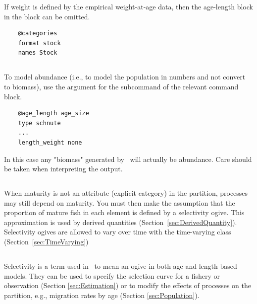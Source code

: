 If weight is defined by the empirical weight-at-age data, then the age-length block in the  block can be omitted.

{\small{\begin{verbatim}
	@categories
	format stock
	names Stock
\end{verbatim}}}

\subsection{\label{sec:weightless-model}}

To model abundance (i.e., to model the population in numbers and not convert to biomass), use the argument  for the subcommand  of the relevant   command block.

{\small{\begin{verbatim}
	@age_length age_size
	type schnute
	...
	length_weight none
\end{verbatim}}}

In this case any "biomass" generated by \CNAME\ will actually be abundance. Care should be taken when interpreting the output.
\fi %

\subsection{\label{sec:maturity-notinpartition}}

When maturity is not an attribute (explicit category) in the partition, processes may still depend on maturity. You must then make the assumption that the proportion of mature fish in each element is defined by a selectivity ogive. This approximation is used by derived quantities (Section~\ref{sec:DerivedQuantity}). Selectivity ogives are allowed to vary over time with the time-varying class (Section~\ref{sec:TimeVarying})

\subsection{\label{sec:Selectivity}}

Selectivity is a term used in \CNAME\ to mean an ogive in both age and length based models. They can be used to specify the selection curve for a fishery or observation  (Section \ref{sec:Estimation}) or to modify the effects of processes on the partition, e.g., migration rates by age (Section \ref{sec:Population}). 

